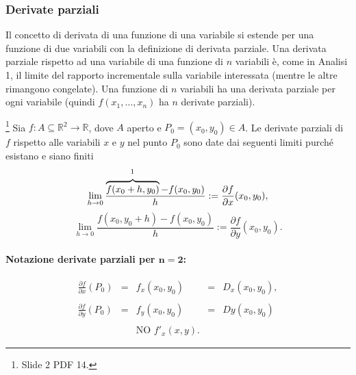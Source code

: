 \subsubsection{Derivate parziali}
Il concetto di derivata di una funzione di una variabile si estende per una funzione di due variabili con la definizione di derivata parziale. Una derivata parziale rispetto ad una variabile di una funzione di $n$ variabili è, come in Analisi 1, il limite del rapporto incrementale sulla variabile interessata (mentre le altre rimangono congelate). Una funzione di $n$ variabili ha una derivata parziale per ogni variabile (quindi $f(x_1,\hdots,x_n)$ ha $n$ derivate parziali).

\begin{definition}[Derivate parziali (caso $n=2$)]\footnote{Slide 2 PDF 14.}
    Sia $f:A\subseteq\mathbb R^2\rightarrow\mathbb R$, dove $A$ aperto e $P_0=(x_0,y_0)\in A$. Le derivate parziali di $f$ rispetto alle variabili $x$ e $y$ nel punto $P_0$ sono date dai seguenti limiti purché esistano e siano finiti
    \begin{equation}\label{eq:derivata_parziale_x}
        \lim_{h\rightarrow 0}\frac{\overbrace{f(x_0+h, y_0)}^{\footnotemark}-f(x_0, y_0)}{h}:=\frac{\partial f}{\partial x}(x_0,y_0),
    \end{equation}
    \begin{equation}\label{eq:derivata_parziale_y}
        \lim_{h\rightarrow 0}\frac{f(x_0, y_0+h)-f(x_0, y_0)}{h}:=\frac{\partial f}{\partial y}(x_0,y_0).
    \end{equation}
\end{definition}

\paragraph{Notazione derivate parziali per $\boldsymbol{n=2}$:}
\begin{equation*}
    \begin{matrix}
        \frac{\partial f}{\partial x}(P_0)&=&f_x(x_0,y_0)&=& D_x(x_0,y_0),\\\\
        \frac{\partial f}{\partial y}(P_0) &=& f_y(x_0,y_0) &=& Dy(x_0,y_0)\\\\
        &&\text{NO } f'_x(x,y).&&
    \end{matrix}
\end{equation*}


